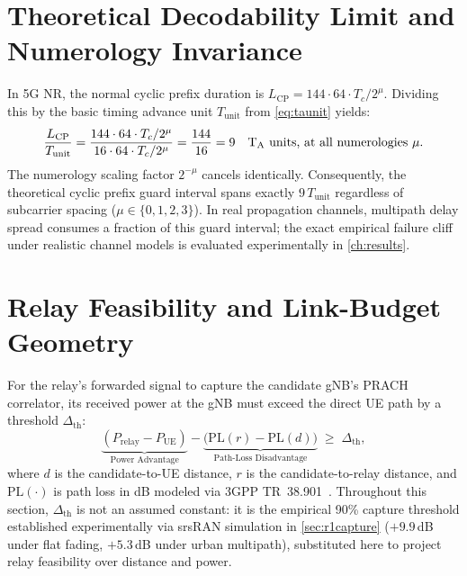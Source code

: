 \section{Theoretical Decodability Limit and Numerology Invariance}
\label{sec:m1boundary}

In 5G NR, the normal cyclic prefix duration is $L_{\mathrm{CP}} = 144 \cdot 64 \cdot T_c / 2^{\mu}$.
Dividing this by the basic timing advance unit $T_{\mathrm{unit}}$ from \cref{eq:taunit} yields:
\begin{equation}
  \frac{L_{\mathrm{CP}}}{T_{\mathrm{unit}}}
  = \frac{144 \cdot 64 \cdot T_c / 2^{\mu}}{16 \cdot 64 \cdot T_c / 2^{\mu}}
  = \frac{144}{16} = 9 \quad \text{T$_\mathrm{A}${} units, at all numerologies } \mu.
  \label{eq:cp9}
\end{equation}
The numerology scaling factor $2^{-\mu}$ cancels identically. Consequently, the theoretical cyclic prefix
guard interval spans exactly $9\,T_{\mathrm{unit}}$ regardless of subcarrier spacing ($\mu \in \{0, 1, 2, 3\}$).
In real propagation channels, multipath delay spread consumes a fraction of this guard interval; the exact
empirical failure cliff under realistic channel models is evaluated experimentally in \cref{ch:results}.

\section{Relay Feasibility and Link-Budget Geometry}
\label{sec:m1delay}

For the relay's forwarded signal to capture the candidate gNB's PRACH correlator, its received power at
the gNB must exceed the direct UE path by a threshold $\Delta_{\mathrm{th}}$:
\begin{equation}
  \underbrace{(P_{\mathrm{relay}} - P_{\mathrm{UE}})}_{\text{Power Advantage}}
  - \underbrace{\bigl(\mathrm{PL}(r) - \mathrm{PL}(d)\bigr)}_{\text{Path-Loss Disadvantage}}
  \;\ge\; \Delta_{\mathrm{th}} ,
  \label{eq:linkbudget}
\end{equation}
where $d$ is the candidate-to-UE distance, $r$ is the candidate-to-relay distance, and $\mathrm{PL}(\cdot)$
is path loss in dB modeled via 3GPP TR~38.901~\cite{3gpp38901}. Throughout this section, $\Delta_{\mathrm{th}}$
is not an assumed constant: it is the empirical 90\% capture threshold established experimentally via
srsRAN simulation in \cref{sec:r1capture} ($+9.9$\,dB under flat fading, $+5.3$\,dB under urban multipath),
substituted here to project relay feasibility over distance and power.

